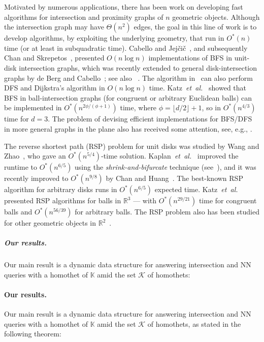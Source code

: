 \documentclass[11pt]{article}
\def\reals{{\mathbb R}}
\def\Kspace{{\mathbb K}}
\def\K{\mathcal{K}}
\def\etal{\textsl{et~al.}}
\theoremstyle{definition}
\begin{document}
Motivated by numerous applications, there has been work on developing fast algorithms 
for intersection and proximity graphs of $n$ geometric objects. Although the intersection 
graph may have $\Theta(n^2)$ edges, the goal in this line of work is to develop algorithms, 
by exploiting the underlying geometry, that run in $O^*(n)$ time (or at least in subquadratic time).
Cabello and Jej\v{c}i\v{c}~\cite{CabelloJ15}, and subsequently Chan and Skrepetos~\cite{CS}, presented
$O(n \log n)$ implementations of BFS in unit-disk intersection graphs, which was recently 
extended to general disk-intersection graphs by de Berg and Cabello~\cite{BergC25}; 
see also ~\cite{KKSS,KMRSS,Klost23}. The algorithm in~\cite{BergC25} can also perform DFS 
and Dijkstra's algorithm in $O(n\log n)$ time.
Katz~\etal~\cite{KSS} showed that BFS in ball-intersection graphs (for congruent or 
arbitrary Euclidean balls)
can be implemented in $O^*(n^{2\phi/(\phi+1)})$ time, where $\phi = \lfloor d/2 \rfloor + 1$, 
so in $O^*(n^{4/3})$ time for $d=3$. The problem of devising efficient implementations for BFS/DFS 
in more general graphs in the plane also has received some attention, 
see, e.g., \cite{AgarwalKKS24,AgarwalKS24,KSS24}.  

The reverse shortest path (RSP) problem for unit disks was studied by 
Wang and Zhao~\cite{WZ}, who gave an $O^*(n^{5/4})$-time solution. 
Kaplan~\etal~\cite{KKSS} improved the runtime to $O^*(n^{6/5})$ using the 
\emph{shrink-and-bifurcate} technique (see~\cite{BFKKS}), and it was recently improved to $O^*(n^{9/8})$ by
Chan and Huang~\cite{CH}. The best-known RSP algorithm for arbitrary disks runs in $O^*(n^{6/5})$ expected time.
Katz~\etal~\cite{KSS} presented RSP algorithms for balls in $\reals^3$ --- with 
$O^*(n^{29/21})$ time for congruent balls and $O^*(n^{56/39})$ for arbitrary balls.  
The RSP problem also has been studied for other geometric objects in 
$\reals^2$~\cite{AgarwalKS24,KSS,CH}.  

\ifsocgproc 
\subparagraph*{Our results.} 
Our main result is a dynamic data structure for answering intersection 
and NN queries with a homothet of $\Kspace$ amid the set $\K$ of homothets:
\else
\paragraph{Our results.} 
Our main result is a dynamic data structure for answering intersection 
and NN queries with a homothet of $\Kspace$ amid the set $\K$ of homothets, as stated in the following theorem:
\fi
\end{document}
